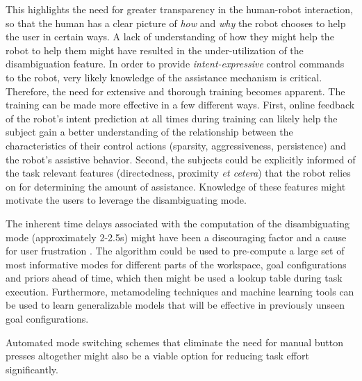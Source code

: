 \documentclass[journal]{IEEEtran}
\begin{document}
This highlights the need for greater transparency in the human-robot interaction, so that the human has a clear picture of \textit{how} and \textit{why} the robot chooses to help the user in certain ways. A lack of understanding of how they might help the robot to help them might have resulted in the under-utilization of the disambiguation feature. In order to provide \textit{intent-expressive} control commands to the robot, very likely knowledge of the assistance mechanism is critical.  
Therefore, the need for extensive and thorough training becomes apparent.
The training can be made more effective in a few different ways. First, online feedback of the robot's intent prediction at all times during training can likely help the subject gain a better understanding of the relationship between the characteristics of their control actions (sparsity, aggressiveness, persistence) and the robot's assistive behavior. Second, the subjects could be explicitly informed of the task relevant features (directedness, proximity \textit{et cetera}) that the robot relies on for determining the amount of assistance. Knowledge of these features might motivate the users to leverage the disambiguating mode. 

The inherent time delays associated with the computation of the disambiguating mode (approximately 2-2.5s) might have been a discouraging factor and a cause for user frustration . The algorithm could be used to pre-compute a large set of most informative modes for different parts of the workspace, goal configurations and priors ahead of time, which then might be used a lookup table during task execution. 
Furthermore, metamodeling techniques and machine learning tools can be used to learn generalizable models that will be effective in previously unseen goal configurations. 

Automated mode switching schemes that eliminate the need for manual button presses altogether might also be a viable option for reducing task effort significantly.
\end{document}
